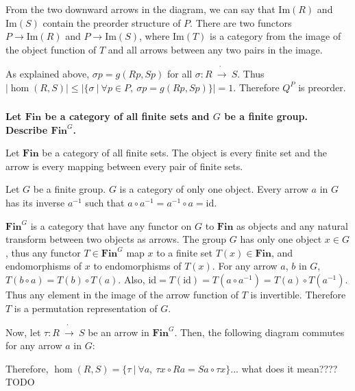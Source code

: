 \documentclass{article}
\begin{document}
From the two downward arrows in the diagram, we can say that $\mathrm{Im}(R)$ and $\mathrm{Im}(S)$ contain the preorder structure of $P$. There are two functors $P \rightarrow \mathrm{Im}(R)$ and $P \rightarrow \mathrm{Im}(S)$, where $\mathrm{Im}(T)$ is a category from the image of the object function of $T$ and all arrows between any two pairs in the image.

As explained above, $\sigma p = g(Rp, Sp)$ for all $\sigma : R\ \dot{\rightarrow}\ S$. Thus $|\hom(R, S)| \leq |\{\sigma\ |\ \forall p \in P,\ \sigma p = g(Rp, Sp)\}| = 1$. Therefore $Q^P$ is preorder.

\subsubsection{}

\textbf{Let $\mathbf{Fin}$ be a category of all finite sets and $G$ be a finite group. Describe $\mathbf{Fin}^G$.}

Let $\mathbf{Fin}$ be a category of all finite sets. The object is every finite set and the arrow is every mapping between every pair of finite sets.

Let $G$ be a finite group. $G$ is a category of only one object. Every arrow $a$ in $G$ has its inverse $a^{-1}$ such that $a \circ a^{-1} = a^{-1} \circ a = \mathrm{id}$.

$\mathbf{Fin}^G$ is a category that have any functor on $G$ to $\mathbf{Fin}$ as objects and any natural transform between two objects as arrows. The group $G$ has only one object $x \in G$, thus any functor $T \in \mathbf{Fin}^G$ map $x$ to a finite set $T(x) \in \mathbf{Fin}$, and endomorphisms of $x$ to endomorphisms of $T(x)$. For any arrow $a$, $b$ in $G$, $T(b \circ a) = T(b) \circ T(a)$. Also, $\mathrm{id} = T(\mathrm{id}) = T(a \circ a^{-1}) = T(a) \circ T(a^{-1})$. Thus any element in the image of the arrow function of $T$ is invertible. Therefore $T$ is a permutation representation of $G$.

Now, let $\tau : R\ \dot{\rightarrow}\ S$ be an arrow in $\mathbf{Fin}^G$. Then, the following diagram commutes for any arrow $a$ in $G$:
\begin{center}
\end{center}
Therefore, $\hom(R, S) = \{\tau\ |\ \forall a,\ \tau x \circ R a = S a \circ \tau x\}$... what does it mean???? TODO
\end{document}
